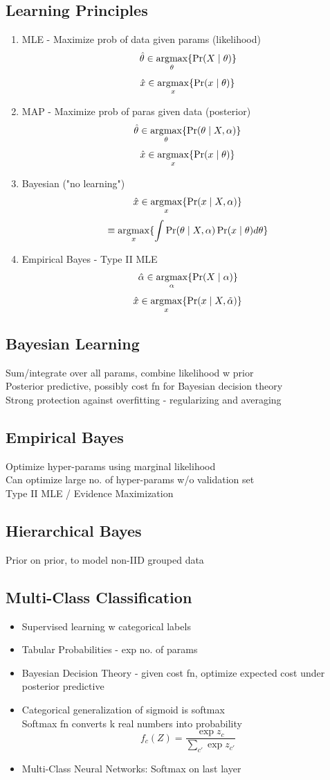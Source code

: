 \subsection*{Learning Principles}
\begin{enumerate}
    \item MLE - Maximize prob of data given params (likelihood)
    \[\hat{\theta}\in\operatorname*{\arg\!\max}_{\theta}\{\Pr(X\mid\theta)\}\]
    \[\hat{x}\in\operatorname*{\arg\!\max}_x \{\Pr(x\mid\theta)\}\]
    \item MAP - Maximize prob of paras given data (posterior)
    \[\hat{\theta}\in\operatorname*{\arg\!\max}_{\theta}\{\Pr(\theta\mid X,\alpha)\}\]
    \[\hat{x}\in\operatorname*{\arg\!\max}_x \{\Pr(x\mid\theta)\}\]
    \item Bayesian ("no learning")
    \[\hat{x}\in\operatorname*{\arg\!\max}_x \{\Pr(x\mid X,\alpha)\}\]
    \[\equiv \operatorname*{\arg\!\max}_x\{\int\Pr(\theta\mid X,\alpha)\Pr(x\mid\theta)d\theta\}\]
    \item Empirical Bayes - Type II MLE
    \[\hat{\alpha}\in\operatorname*{\arg\!\max}_{\alpha}\{\Pr(X\mid\alpha)\}\]
    \[\hat{x}\in\operatorname*{\arg\!\max}_x\{\Pr(x\mid X,\tilde{\alpha})\}\]
\end{enumerate}
\subsection*{Bayesian Learning}
Sum/integrate over all params, combine likelihood w prior\\
Posterior predictive, possibly cost fn for Bayesian decision theory\\
Strong protection against overfitting - regularizing and averaging
\subsection*{Empirical Bayes}
Optimize hyper-params using marginal likelihood\\
Can optimize large no. of hyper-params w/o validation set\\
Type II MLE / Evidence Maximization
\subsection*{Hierarchical Bayes}
Prior on prior, to model non-IID grouped data
\subsection*{Multi-Class Classification}
\begin{itemize}
    \item Supervised learning w categorical labels
    \item Tabular Probabilities - exp no. of params
    \item Bayesian Decision Theory - given cost fn, optimize expected cost under posterior predictive
    \item Categorical generalization of sigmoid is softmax\\
    Softmax fn converts k real numbers into probability
    \[f_c(Z)=\frac{\exp z_c}{\sum_{c'}\exp z_{c'}}\]
    \item Multi-Class Neural Networks: Softmax on last layer
\end{itemize}
